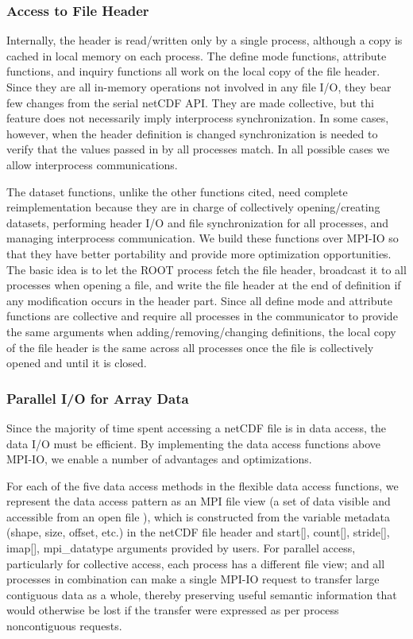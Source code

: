 \documentclass[10pt,twocolumn]{article}          %
\begin{document}
\subsubsection{Access to File Header}

Internally, the header is read/written only by a single process, although a copy is cached in local
memory on each process. The define mode functions, attribute functions, and inquiry functions all
work on the local copy of the file header. Since they are all in-memory operations not involved
in any file I/O, they bear few changes from the serial netCDF API. They are made collective, but thi feature 
does not necessarily imply interprocess synchronization. In some cases, however, when the
header definition is changed synchronization is needed to verify that
the values passed in by all processes match. In all possible cases we
allow interprocess communications.

The dataset functions, unlike the other functions cited, need complete reimplementation because they are in charge of
collectively opening/creating datasets, performing header I/O and file synchronization for all
processes, and managing interprocess communication. We build these functions over MPI-IO so that
they have better portability and provide more optimization opportunities. The basic idea is to let
the ROOT process fetch the file header, broadcast it to all processes when opening a file, and 
write the file header at the end of definition if any modification occurs in
the header part. Since all define mode and attribute functions are collective and require all processes
in the communicator to provide the same arguments when adding/removing/changing definitions, the
local copy of the file header is the same across all processes once the file is
collectively opened and until it is closed.

\subsubsection{Parallel I/O for Array Data}

Since the majority of time spent accessing a netCDF file is in data access,
the data I/O must be efficient. By implementing the data access functions above
MPI-IO, we enable a number of advantages and optimizations.

For each of the five data access methods in the flexible data access functions, we represent the
data access pattern as an MPI file view (a set of data visible and accessible from an open file
\cite{Mess97}), which is constructed from the variable metadata (shape, size, offset, etc.) in the
netCDF file header and start[], count[], stride[], imap[], mpi\_datatype arguments provided by
users. For parallel access, particularly for collective access, each process has a different file
view; and all processes in combination can make a single MPI-IO request to transfer large
contiguous data as a whole, thereby preserving useful semantic information that would otherwise be
lost if the transfer were expressed as per process noncontiguous requests.
\end{document}
